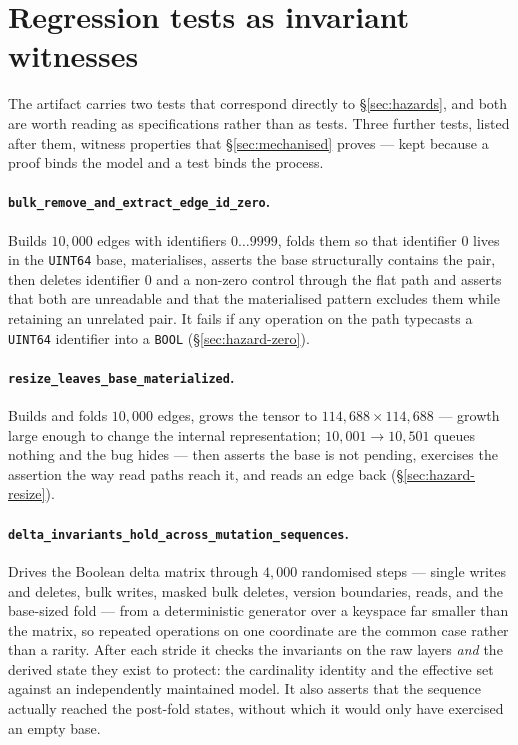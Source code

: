 \documentclass[11pt,a4paper]{article}
\theoremstyle{plain}
\theoremstyle{definition}
\theoremstyle{remark}
\begin{document}
\section{Regression tests as invariant witnesses}
\label{app:tests}

The artifact carries two tests that correspond directly to
\S\ref{sec:hazards}, and both are worth reading as specifications rather than
as tests. Three further tests, listed after them, witness properties that
\S\ref{sec:mechanised} proves --- kept because a proof binds the model and a
test binds the process.

\paragraph{\texttt{bulk\_remove\_and\_extract\_edge\_id\_zero}.}
Builds $10{,}000$ edges with identifiers $0\ldots9999$, folds them so that
identifier $0$ lives in the \texttt{UINT64} base, materialises, asserts the
base structurally contains the pair, then deletes identifier $0$ and a
non-zero control through the flat path and asserts that both are unreadable
and that the materialised pattern excludes them while retaining an unrelated
pair. It fails if any operation on the path typecasts a \texttt{UINT64}
identifier into a \texttt{BOOL} (\S\ref{sec:hazard-zero}).

\paragraph{\texttt{resize\_leaves\_base\_materialized}.}
Builds and folds $10{,}000$ edges, grows the tensor to $114{,}688 \times
114{,}688$ --- growth large enough to change the internal representation;
$10{,}001 \to 10{,}501$ queues nothing and the bug hides --- then asserts the
base is not pending, exercises the assertion the way read paths reach it, and
reads an edge back (\S\ref{sec:hazard-resize}).

\paragraph{\texttt{delta\_invariants\_hold\_across\_mutation\_sequences}.}
Drives the Boolean delta matrix through $4{,}000$ randomised steps --- single
writes and deletes, bulk writes, masked bulk deletes, version boundaries, reads,
and the base-sized fold --- from a deterministic generator over a keyspace far
smaller than the matrix, so repeated operations on one coordinate are the common
case rather than a rarity. After each stride it checks the invariants on the raw
layers \emph{and} the derived state they exist to protect: the cardinality
identity and the effective set against an independently maintained model. It
also asserts that the sequence actually reached the post-fold states, without
which it would only have exercised an empty base.
\end{document}
